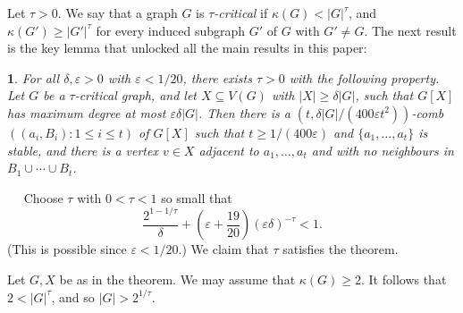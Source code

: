 \documentclass[titlepage,11pt]{article}
\def\ll{,\ldots,}
\def\cupcup{\cup\cdots\cup}
\newcommand{\vare}{\varepsilon}
\newtheorem{thm}{}[section]
\newcommand{\Proof}{\noindent{\bf Proof.}\ \ }
\begin{document}
Let $\tau>0$. We say that a graph $G$ is {\em $\tau$-critical} if $\kappa(G)<|G|^\tau$, and 
$\kappa(G')\ge |G'|^\tau$ for every induced subgraph $G'$ of $G$ with $G'\ne G$.
The next result is the key lemma that unlocked all the main results in this paper:

\begin{thm}\label{usesparse}
For all $\delta,\vare>0$ with $\vare<1/20$, 
there exists $\tau>0$ with the following property.
Let $G$ be a $\tau$-critical graph, and let $X\subseteq V(G)$
with $|X|\ge \delta|G|$, such that $G[X]$ has maximum degree at most $\vare\delta|G|$.
Then 
there is 
a $(t,\delta|G|/(400\vare t^2))$-comb $((a_i,B_i):1\le i\le t)$ of $G[X]$ such that $t\ge 1/(400\vare)$ and $\{a_1\ll a_t\}$ is stable, and 
there is a vertex $v\in X$ adjacent to $a_1\ll a_t$ and with
no neighbours in $B_1\cupcup B_t$.
\end{thm}
\Proof
Choose $\tau$ with $0<\tau<1$ so small that 
$$\frac{2^{1-1/\tau}}{\delta}+ \left(\vare+\frac{19}{20}\right)\left(\vare\delta\right)^{-\tau}< 1.$$
(This is possible since $\vare<1/20$.)
We claim that $\tau$ satisfies the theorem.

Let $G,X$ be as in the theorem. We may assume that $\kappa(G)\ge 2$.
It follows that $2<|G|^\tau$, and so $|G|>2^{1/\tau}$. 
\end{document}
